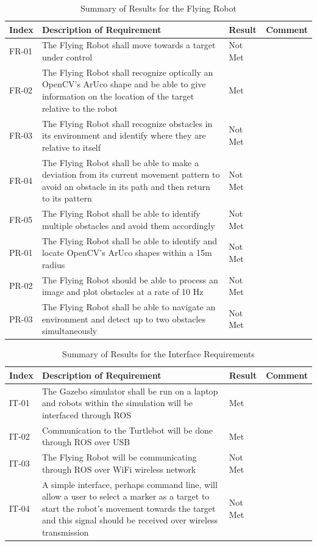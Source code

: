 \documentclass{article}
\begin{document}
	\begin{table}
	    \small
		\begin{tabular}{p{2cm} p{8cm} p{2cm} p{3cm}}
			\hline
			{\textbf{Index}} & {\textbf{Description of Requirement}} & {\textbf{Result}} & {\textbf{Comment}} \\ \hline
FR-01 & The Flying Robot shall move towards a target under control & Not Met \\
FR-02 & The Flying Robot shall recognize optically an OpenCV's ArUco shape and be able to give information on the location of the target relative to the robot & Met \\
FR-03 & The Flying Robot shall recognize obstacles in its environment and identify where they are relative to itself & Not Met \\
FR-04 & The Flying Robot shall be able to make a deviation from its current movement pattern to avoid an obstacle in its path and then return to its pattern & Not Met  \\
FR-05 & The Flying Robot shall be able to identify multiple obstacles and avoid them accordingly & Not Met \\
PR-01 & The Flying Robot shall be able to identify and locate OpenCV's ArUco shapes within a 15m radius & Not Met \\
PR-02 & The Flying Robot should be able to process an image and plot obstacles at a rate of 10 Hz & Not Met \\
PR-03 & The Flying Robot shall be able to navigate an environment and detect up to two obstacles simultaneously & Not Met \\ \hline
		\end{tabular}
		\caption{Summary of Results for the Flying Robot}
		\label{table:uavresults}
    \end{table}


	\begin{table}
	    \small
		\begin{tabular}{p{2cm} p{8cm} p{2cm} p{3cm}}
			\hline
			{\textbf{Index}} & {\textbf{Description of Requirement}} & {\textbf{Result}} & {\textbf{Comment}} \\ \hline
IT-01 & The Gazebo simulator shall be run on a laptop and robots within the simulation will be interfaced through ROS & Met \\
IT-02 & Communication to the Turtlebot will be done through ROS over USB & Met \\
IT-03 & The Flying Robot will be communicating through ROS over WiFi wireless network & Not Met \\
IT-04 & A simple interface, perhaps command line, will allow a user to select a marker as a target to start the robot's movement towards the target and this signal should be received over wireless transmission & Not Met \\ \hline
		\end{tabular}
		\caption{Summary of Results for the Interface Requirements}
		\label{table:interresults}
    \end{table}
\end{document}
